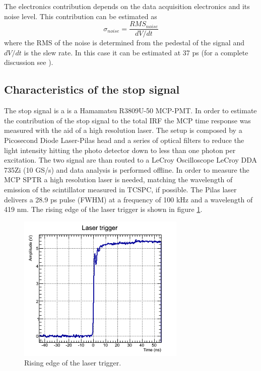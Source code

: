 The electronics contribution depends on the data acquisition electronics and its noise level. This contribution can be estimated as
\begin{equation}
\sigma _{noise} = \frac{RMS _{noise}}{dV/dt}
\end{equation}
where the RMS of the noise is determined from the pedestal of the signal and $dV/dt$ is the slew rate. In this case it can be estimated at 37 ps (for a complete discussion see \cite{Gundacker2014}). 

\subsection{Characteristics of the stop signal}
The stop signal is a is a Hamamatsu R3809U-50 MCP-PMT. In order to estimate the contribution of the stop signal to the total IRF the MCP time response was measured with the aid of a high resolution laser.
The setup is composed by a Picosecond Diode Laser-Pilas head and a series of optical filters to reduce the light intensity hitting the photo detector down to less than one photon per excitation. The two signal are than routed to a LeCroy Oscilloscope LeCroy DDA 735Zi (10 GS/s) and data analysis is performed offline.
In order to measure the MCP SPTR a high resolution laser is needed, matching the wavelength of emission of the scintillator measured in TCSPC, if possible. The Pilas laser delivers a 28.9 ps pulse (FWHM) at a frequency of 100 kHz and a wavelength of 419 nm. The rising edge of the laser trigger is shown in figure \ref{fig:trigger}.
\begin{figure}[htbp]
\begin{center}
\includegraphics[width=8cm]{../Pictures/Chapter_8/laser_trigger.png}
\end{center}
\caption[Laser trigger]{Rising edge of the laser trigger.}
\label{fig:trigger}
\end{figure}
